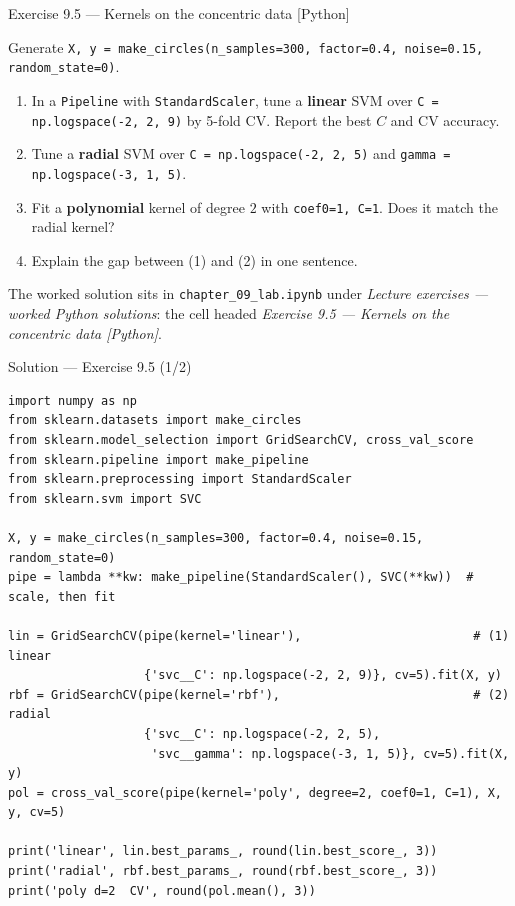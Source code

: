 \documentclass[aspectratio=169,11pt]{beamer}
\begin{document}
\begin{frame}{Exercise 9.5 --- Kernels on the concentric data [Python]}
\begin{exercise}
  Generate \texttt{X, y = make\_circles(n\_samples=300, factor=0.4,
  noise=0.15, random\_state=0)}.
  \begin{enumerate}
    \item In a \texttt{Pipeline} with \texttt{StandardScaler}, tune a
          \textbf{linear} SVM over \texttt{C = np.logspace(-2, 2, 9)} by
          5-fold CV. Report the best $C$ and CV accuracy.
    \item Tune a \textbf{radial} SVM over \texttt{C = np.logspace(-2, 2, 5)}
          and \texttt{gamma = np.logspace(-3, 1, 5)}.
    \item Fit a \textbf{polynomial} kernel of degree $2$ with
          \texttt{coef0=1, C=1}. Does it match the radial kernel?
    \item Explain the gap between (1) and (2) in one sentence.
  \end{enumerate}
\end{exercise}
\begin{labnote}
  The worked solution sits in \texttt{chapter\_09\_lab.ipynb} under
  \emph{Lecture exercises --- worked Python solutions}: the cell headed
  \emph{Exercise 9.5 --- Kernels on the concentric data [Python]}.
\end{labnote}
\end{frame}

\begin{frame}[fragile]{Solution --- Exercise 9.5 (1/2)}
\begin{solutionbox}
\begin{lstlisting}[basicstyle=\ttfamily\tiny]
import numpy as np
from sklearn.datasets import make_circles
from sklearn.model_selection import GridSearchCV, cross_val_score
from sklearn.pipeline import make_pipeline
from sklearn.preprocessing import StandardScaler
from sklearn.svm import SVC

X, y = make_circles(n_samples=300, factor=0.4, noise=0.15, random_state=0)
pipe = lambda **kw: make_pipeline(StandardScaler(), SVC(**kw))  # scale, then fit

lin = GridSearchCV(pipe(kernel='linear'),                        # (1) linear
                   {'svc__C': np.logspace(-2, 2, 9)}, cv=5).fit(X, y)
rbf = GridSearchCV(pipe(kernel='rbf'),                           # (2) radial
                   {'svc__C': np.logspace(-2, 2, 5),
                    'svc__gamma': np.logspace(-3, 1, 5)}, cv=5).fit(X, y)
pol = cross_val_score(pipe(kernel='poly', degree=2, coef0=1, C=1), X, y, cv=5)

print('linear', lin.best_params_, round(lin.best_score_, 3))
print('radial', rbf.best_params_, round(rbf.best_score_, 3))
print('poly d=2  CV', round(pol.mean(), 3))
\end{lstlisting}
\end{solutionbox}
\end{frame}
\end{document}
